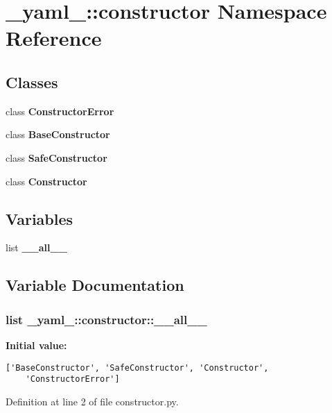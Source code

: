 \section{\_\-yaml\_\-::constructor Namespace Reference}
\label{namespace__yaml___1_1constructor}


\subsection*{Classes}
\begin{CompactItemize}
\item 
class {\bf ConstructorError}
\item 
class {\bf BaseConstructor}
\item 
class {\bf SafeConstructor}
\item 
class {\bf Constructor}
\end{CompactItemize}
\subsection*{Variables}
\begin{CompactItemize}
\item 
list {\bf \_\-\_\-all\_\-\_\-}
\end{CompactItemize}


\subsection{Variable Documentation}
\subsubsection{\setlength{\rightskip}{0pt plus 5cm}list {\bf \_\-yaml\_\-::constructor::\_\-\_\-all\_\-\_\-}\hspace{0.3cm}{\tt  [static]}}\label{namespace__yaml___1_1constructor_fd1cbf6a7b29f9d62a537841bee107d5}


\textbf{Initial value:}

\begin{Code}\begin{verbatim}['BaseConstructor', 'SafeConstructor', 'Constructor',
    'ConstructorError']
\end{verbatim}
\end{Code}


Definition at line 2 of file constructor.py.